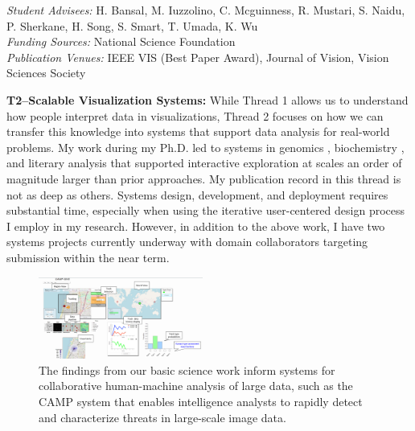 \documentclass[11pt]{article}
\begin{document}


\emph{Student Advisees: }H. Bansal, M. Iuzzolino, C. Mcguinness, R. Mustari, S. Naidu, P. Sherkane, H. Song, S. Smart, T. Umada, K. Wu\\
\emph{Funding Sources:} National Science Foundation\\
\emph{Publication Venues:} IEEE VIS (Best Paper Award), Journal of Vision, Vision Sciences Society

\textbf{T2--Scalable Visualization Systems: }
While Thread 1 allows us to understand how people interpret data in visualizations, Thread 2 focuses on how we can transfer this knowledge into systems that support data analysis for real-world problems. My work during my Ph.D. led to systems in genomics \cite{albers2014Sequence}, biochemistry \cite{sarikaya2014Molecular}, and literary analysis \cite{szafir2016TextDNA} that supported interactive exploration at scales an order of magnitude larger than prior approaches. My publication record in this thread is not as deep as others. Systems design, development, and deployment requires substantial time, especially when using the iterative user-centered design process I employ in my research. However, in addition to the above work, I have two systems projects currently underway with domain collaborators targeting submission within the near term. 

\begin{figure}
	\begin{center}
		\includegraphics[width=0.48\textwidth]{interface}
	\end{center}
	\caption{The findings from our basic science work inform systems for collaborative human-machine analysis of large data, such as the CAMP system that enables intelligence analysts to rapidly detect and characterize threats in large-scale image data.}
\end{figure}
\end{document}
